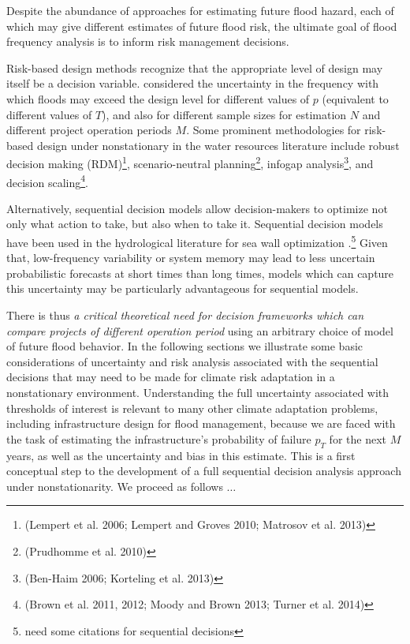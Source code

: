 \documentclass[12pt]{article}
\begin{document}
Despite the abundance of approaches for estimating future flood hazard, each of which may give different estimates of future flood risk, the ultimate goal of flood frequency analysis is to inform risk management decisions.

Risk-based design methods \citep[RBDM; see][]{Rosner2014} recognize that the appropriate level of design may itself be a decision variable.
\citet{Lall1987} considered the uncertainty in the frequency with which floods may exceed the design level for different values of \(p\) (equivalent to different values of \(T\)), and also for different sample sizes for estimation \(N\) and different project operation periods \(M\).
Some prominent methodologies for risk-based design under nonstationary in the water resources literature include robust decision making (RDM)\footnote{(Lempert et al. 2006; Lempert and Groves 2010; Matrosov et al. 2013)}, scenario-neutral planning\footnote{(Prudhomme et al. 2010)}, infogap analysis\footnote{(Ben-Haim 2006; Korteling et al. 2013)}, and decision scaling\footnote{(Brown et al. 2011, 2012; Moody and Brown 2013; Turner et al. 2014)}.

Alternatively, sequential decision models \citep[see][]{Russell2003,Howard1960} allow decision-makers to optimize not only what action to take, but also when to take it.
Sequential decision models have been used in the hydrological literature for sea wall optimization \citep{Lickley2014}.\footnote{need some citations for sequential decisions}
Given that, low-frequency variability or system memory may lead to less uncertain probabilistic forecasts at short times than long times, models which can capture this uncertainty may be particularly advantageous for sequential models.

There is thus \emph{a critical theoretical need for decision frameworks which can compare projects of different operation period} using an arbitrary choice of model of future flood behavior.
In the following sections we illustrate some basic considerations of uncertainty and risk analysis associated with the sequential decisions that may need to be made for climate risk adaptation in a nonstationary environment.
Understanding the full uncertainty associated with thresholds of interest is relevant to many other climate adaptation problems, including infrastructure design for flood management, because we are faced with the task of estimating the infrastructure's probability of failure \(p_T\) for the next \(M\) years, as well as the uncertainty and bias in this estimate.
This is a first conceptual step to the development of a full sequential decision analysis approach under nonstationarity.
We proceed as follows \(\ldots{}\)
\end{document}

